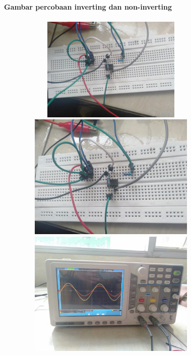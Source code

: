 \documentclass[12pt,a4paper]{article}
\begin{document}
\newpage
\begin{figure}
\paragraph{Gambar percobaan inverting dan non-inverting}
\paragraph{ }
\begin{center}

\includegraphics[width=12cm, height=5cm]{inverting4.png}

\includegraphics[width=12cm, height=6cm]{inverting5.png}

\includegraphics[width=12cm, height=6cm]{noninverting3.png}

\end{center}
\end{figure}
\vspace{2cm}
\end{document}
